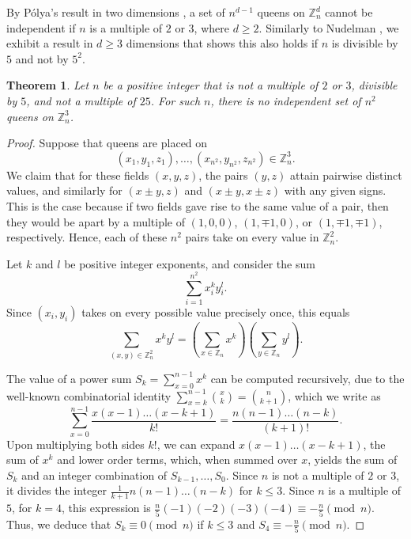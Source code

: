 \documentclass[11pt]{article}
\newtheorem{theorem}[problem]{Theorem}
\begin{document}
By Pólya's result in two dimensions \cite{Pol}, a set of $n^{d-1}$ queens on $\mathbb{Z}_n^d$ cannot be independent if $n$ is a multiple of $2$ or $3$, where $d\ge 2$. Similarly to Nudelman \cite{Nud}, we exhibit a result in $d\ge 3$ dimensions that shows this also holds if $n$ is divisible by $5$ and not by $5^2$.

\begin{theorem}\label{525}
Let $n$ be a positive integer that is not a multiple of $2$ or $3$, divisible by $5$, and not a multiple of $25$. For such $n$, there is no independent set of $n^{2}$ queens on $\mathbb{Z}_n^3$.
\end{theorem}

\begin{proof}
Suppose that queens are placed on
$$(x_1,y_1,z_1),\dots,(x_{n^2},y_{n^2},z_{n^2})\in \mathbb{Z}_n^3.$$
We claim that for these fields $(x,y,z)$, the pairs $(y,z)$ attain pairwise distinct values, and similarly for $(x\pm y,z)$ and $(x\pm y,x\pm z)$ with any given signs. This is the case because if two fields gave rise to the same value of a pair, then they would be apart by a multiple of $(1,0,0)$, $(1,\mp 1,0)$, or $(1,\mp 1,\mp 1)$, respectively. Hence, each of these $n^2$ pairs take on every value in $\mathbb{Z}_n^2$.

Let $k$ and $l$ be positive integer exponents, and consider the sum
$$\sum_{i=1}^{n^2} x_i^k y_i^l.$$
Since $(x_i,y_i)$ takes on every possible value precisely once, this equals
$$\sum_{(x,y)\in \mathbb{Z}_n^2}x^ky^l=\left(\sum_{x\in \mathbb{Z}_n}x^k\right)\left(\sum_{y\in \mathbb{Z}_n}y^l\right).$$

The value of a power sum $S_k=\sum_{x=0}^{n-1}x^k$ can be computed recursively, due to the well-known combinatorial identity $\sum_{x=k}^{n-1} \binom {x}{k}=\binom{n}{k+1}$, which we write as
$$\sum_{x=0}^{n-1} \frac{x(x-1)\dots(x-k+1)}{k!}=\frac{n(n-1)\dots(n-k)}{(k+1)!}.$$
Upon multiplying both sides $k!$, we can expand $x(x-1)\dots(x-k+1)$, the sum of $x^k$ and lower order terms, which, when summed over $x$, yields the sum of $S_k$ and an integer combination of $S_{k-1},\ldots,S_0$. Since $n$ is not a multiple of $2$ or $3$, it divides the integer $\frac1{k+1} n(n-1)\dots(n-k)$ for $k\le 3$. Since $n$ is a multiple of $5$, for $k=4$, this expression is $\frac{n}{5}(-1)(-2)(-3)(-4)\equiv -\frac{n}{5} \pmod n$. Thus, we deduce that $S_k\equiv 0\pmod n$ if $k\le 3$ and $S_4\equiv -\frac{n}{5}\pmod n$.


\end{proof}
\end{document}
